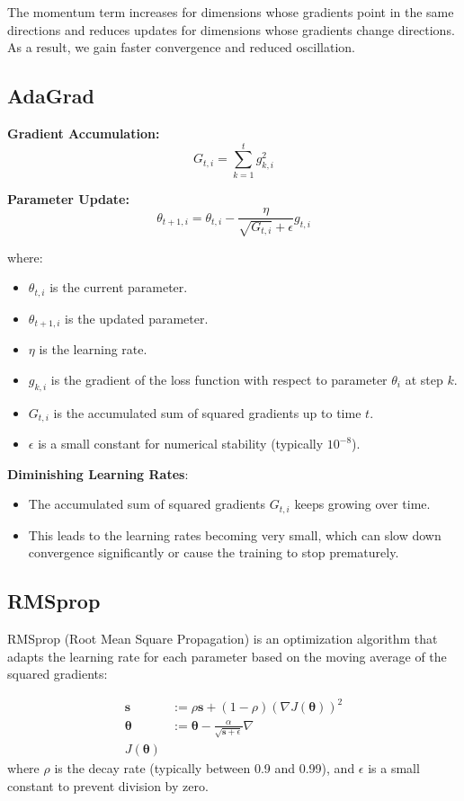 \documentclass[12pt]{article}
\begin{document}
The momentum term increases for dimensions whose gradients point in the same directions and reduces updates for dimensions whose gradients change directions. As a result, we gain faster convergence and reduced oscillation.

\subsection{AdaGrad}

\textbf{Gradient Accumulation:}
\[
G_{t,i} = \sum_{k=1}^{t} g_{k,i}^2
\]

\textbf{Parameter Update:}
\[
\theta_{t+1,i} = \theta_{t,i} - \frac{\eta}{\sqrt{G_{t,i}} + \epsilon} g_{t,i}
\]

where:
\begin{itemize}
    \item \( \theta_{t,i} \) is the current parameter.
    \item \( \theta_{t+1,i} \) is the updated parameter.
    \item \( \eta \) is the learning rate.
    \item \( g_{k,i} \) is the gradient of the loss function with respect to parameter \( \theta_i \) at step \( k \).
    \item \( G_{t,i} \) is the accumulated sum of squared gradients up to time \( t \).
    \item \( \epsilon \) is a small constant for numerical stability (typically \( 10^{-8} \)).
\end{itemize}

\textbf{Diminishing Learning Rates}:
   \begin{itemize}
       \item The accumulated sum of squared gradients \( G_{t,i} \) keeps growing over time.
       \item This leads to the learning rates becoming very small, which can slow down convergence significantly or cause the training to stop prematurely.
   \end{itemize}

\subsection{RMSprop}

RMSprop (Root Mean Square Propagation) is an optimization algorithm that adapts the learning rate for each parameter based on the moving average of the squared gradients:

\begin{align*}
	\mathbf{s} &:= \rho \mathbf{s} + (1 - \rho) (\nabla J(\boldsymbol{\theta}))^2\\
\boldsymbol{\theta} &:= \boldsymbol{\theta} - \frac{\alpha}{\sqrt{\mathbf{s} + \epsilon}} \nabla \\J(\boldsymbol{\theta})
\end{align*}
where $\rho$ is the decay rate (typically between 0.9 and 0.99), and $\epsilon$ is a small constant to prevent division by zero.
\end{document}
